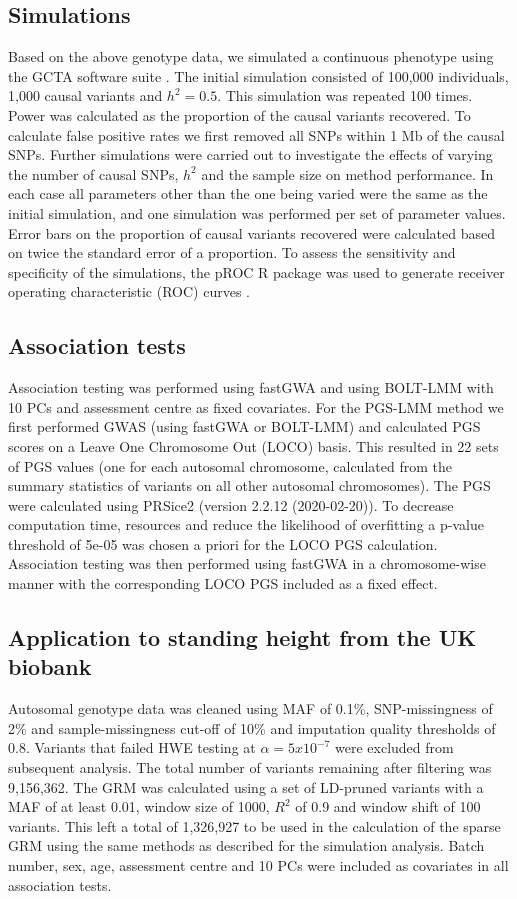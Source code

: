 \documentclass[doublespacing]{bmcart}
\begin{document}
\subsection*{Simulations} 
Based on the above genotype data, we simulated a continuous phenotype using the GCTA software suite \cite{yang2011gcta}. The initial simulation consisted of 100,000 individuals, 1,000 causal variants and $h^2 = 0.5$. This simulation was repeated 100 times. Power was calculated as the proportion of the causal variants recovered. To calculate false positive rates we first removed all SNPs within 1 Mb of the causal SNPs. Further simulations were carried out to investigate the effects of varying the number of causal SNPs, $h^2$ and the sample size on method performance. In each case all parameters other than the one being varied were the same as the initial simulation, and one simulation was performed per set of parameter values. Error bars on the proportion of causal variants recovered were calculated based on twice the standard error of a proportion. To assess the sensitivity and specificity of the simulations, the pROC R package was used to generate receiver operating characteristic (ROC) curves \cite{robin2011proc}. 

\subsection*{Association tests} 
Association testing was performed using fastGWA and using BOLT-LMM with 10 PCs and assessment centre as fixed covariates. For the PGS-LMM method we first performed GWAS (using fastGWA or BOLT-LMM) and calculated PGS scores on a Leave One Chromosome Out (LOCO) basis. This resulted in 22 sets of PGS values (one for each autosomal chromosome, calculated from the summary statistics of variants on all other autosomal chromosomes). The PGS were calculated using PRSice2 (version 2.2.12 (2020-02-20))\cite{choi2019prsice}. To decrease computation time, resources and reduce the likelihood of overfitting a p-value threshold of 5e-05 was chosen a priori for the LOCO PGS calculation. Association testing was then performed using fastGWA in a chromosome-wise manner with the corresponding LOCO PGS included as a fixed effect.  

\subsection*{Application to standing height from the UK biobank} 
Autosomal genotype data was cleaned using MAF of 0.1\%, SNP-missingness of 2\% and sample-missingness cut-off of 10\% and imputation quality thresholds of 0.8. Variants that failed HWE testing at $\alpha{=5x10^{-7}}$ were excluded from subsequent analysis. The total number of variants remaining after filtering was 9,156,362. The GRM was calculated using a set of LD-pruned variants with a MAF of at least 0.01, window size of 1000, $R^2$ of 0.9 and window shift of 100 variants. This left a total of 1,326,927 to be used in the calculation of the sparse GRM using the same methods as described for the simulation analysis. Batch number, sex, age, assessment centre and 10 PCs were included as covariates in all association tests.
\end{document}
